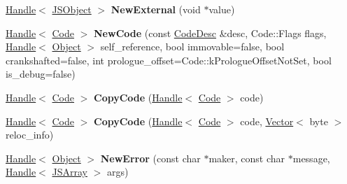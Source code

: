 \begin{DoxyCompactItemize}
\item 
\hypertarget{classv8_1_1internal_1_1_v8___f_i_n_a_l_a83fff911e1c251b34b2875c1383f7dc7}{}\hyperlink{classv8_1_1internal_1_1_handle}{Handle}$<$ \hyperlink{classv8_1_1internal_1_1_j_s_object}{J\+S\+Object} $>$ {\bfseries New\+External} (void $\ast$value)\label{classv8_1_1internal_1_1_v8___f_i_n_a_l_a83fff911e1c251b34b2875c1383f7dc7}

\item 
\hypertarget{classv8_1_1internal_1_1_v8___f_i_n_a_l_a20747ba20c159172e8627eab86304547}{}\hyperlink{classv8_1_1internal_1_1_handle}{Handle}$<$ \hyperlink{classv8_1_1internal_1_1_code}{Code} $>$ {\bfseries New\+Code} (const \hyperlink{structv8_1_1internal_1_1_code_desc}{Code\+Desc} \&desc, Code\+::\+Flags flags, \hyperlink{classv8_1_1internal_1_1_handle}{Handle}$<$ \hyperlink{classv8_1_1internal_1_1_object}{Object} $>$ self\+\_\+reference, bool immovable=false, bool crankshafted=false, int prologue\+\_\+offset=Code\+::k\+Prologue\+Offset\+Not\+Set, bool is\+\_\+debug=false)\label{classv8_1_1internal_1_1_v8___f_i_n_a_l_a20747ba20c159172e8627eab86304547}

\item 
\hypertarget{classv8_1_1internal_1_1_v8___f_i_n_a_l_ae8680511af358fe39f07a2dfa2af4112}{}\hyperlink{classv8_1_1internal_1_1_handle}{Handle}$<$ \hyperlink{classv8_1_1internal_1_1_code}{Code} $>$ {\bfseries Copy\+Code} (\hyperlink{classv8_1_1internal_1_1_handle}{Handle}$<$ \hyperlink{classv8_1_1internal_1_1_code}{Code} $>$ code)\label{classv8_1_1internal_1_1_v8___f_i_n_a_l_ae8680511af358fe39f07a2dfa2af4112}

\item 
\hypertarget{classv8_1_1internal_1_1_v8___f_i_n_a_l_a2c76487f98deb9028cd47768c8cadb52}{}\hyperlink{classv8_1_1internal_1_1_handle}{Handle}$<$ \hyperlink{classv8_1_1internal_1_1_code}{Code} $>$ {\bfseries Copy\+Code} (\hyperlink{classv8_1_1internal_1_1_handle}{Handle}$<$ \hyperlink{classv8_1_1internal_1_1_code}{Code} $>$ code, \hyperlink{classv8_1_1internal_1_1_vector}{Vector}$<$ byte $>$ reloc\+\_\+info)\label{classv8_1_1internal_1_1_v8___f_i_n_a_l_a2c76487f98deb9028cd47768c8cadb52}

\item 
\hypertarget{classv8_1_1internal_1_1_v8___f_i_n_a_l_ae44c65282e55a807bf4f5dafbd49bc04}{}\hyperlink{classv8_1_1internal_1_1_handle}{Handle}$<$ \hyperlink{classv8_1_1internal_1_1_object}{Object} $>$ {\bfseries New\+Error} (const char $\ast$maker, const char $\ast$message, \hyperlink{classv8_1_1internal_1_1_handle}{Handle}$<$ \hyperlink{classv8_1_1internal_1_1_j_s_array}{J\+S\+Array} $>$ args)\label{classv8_1_1internal_1_1_v8___f_i_n_a_l_ae44c65282e55a807bf4f5dafbd49bc04}


\end{DoxyCompactItemize}
